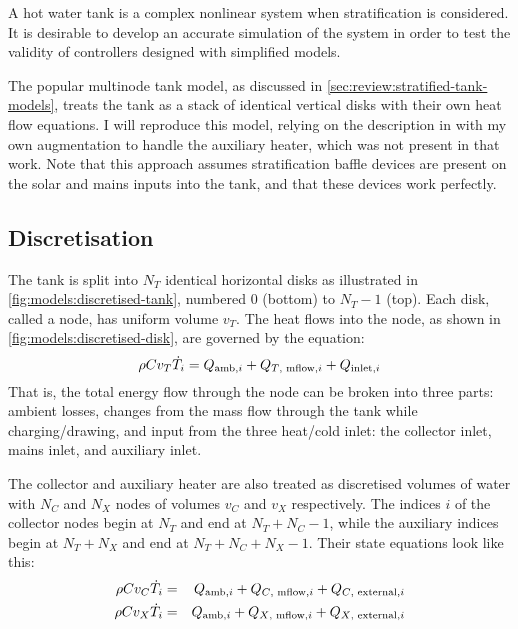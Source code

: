 A hot water tank is a complex nonlinear system when stratification is considered.
It is desirable to develop an accurate simulation of the system in order to test the validity of controllers designed with simplified models.

The popular multinode tank model, as discussed in \autoref{sec:review:stratified-tank-models}, treats the tank as a stack of identical vertical disks with their own heat flow equations.
I will reproduce this model, relying on the description in \textcite{Cristofari02} with my own augmentation to handle the auxiliary heater, which was not present in that work.
Note that this approach assumes stratification baffle devices are present on the solar and mains inputs into the tank, and that these devices work perfectly.

\subsection{Discretisation}

The tank is split into $N_T$ identical horizontal disks as illustrated in \autoref{fig:models:discretised-tank}, numbered $0$ (bottom) to $N_T-1$ (top).
Each disk, called a node, has uniform volume $v_T$.
The heat flows into the node, as shown in \autoref{fig:models:discretised-disk}, are governed by the equation:
\begin{equation}
   \label{eq:tank-node-dT}
   \rho C v_T \dot{T}_i = Q_{\text{amb}, i} + Q_{\text{$T$, mflow}, i} + Q_{\text{inlet}, i}
\end{equation}
That is, the total energy flow through the node can be broken into three parts: ambient losses, changes from the mass flow through the tank while charging/drawing, and input from the three heat/cold inlet: the collector inlet, mains inlet, and auxiliary inlet.

The collector and auxiliary heater are also treated as discretised volumes of water with $N_C$ and $N_X$ nodes of volumes $v_C$ and $v_X$ respectively.
The indices $i$ of the collector nodes begin at $N_T$ and end at $N_T+N_C-1$, while the auxiliary indices begin at $N_T+N_X$ and end at $N_T+N_C+N_X-1$.
Their state equations look like this:
\begin{eqnarray}
   \label{eq:coll-node-dT}
   \rho C v_C \dot{T}_i &=& Q_{\text{amb}, i} + Q_{\text{$C$, mflow}, i} + Q_{\text{$C$, external}, i} \\
   \label{eq:aux-node-dT}
   \rho C v_X \dot{T}_i &=& Q_{\text{amb}, i} + Q_{\text{$X$, mflow}, i} + Q_{\text{$X$, external}, i} \\
\end{eqnarray}

